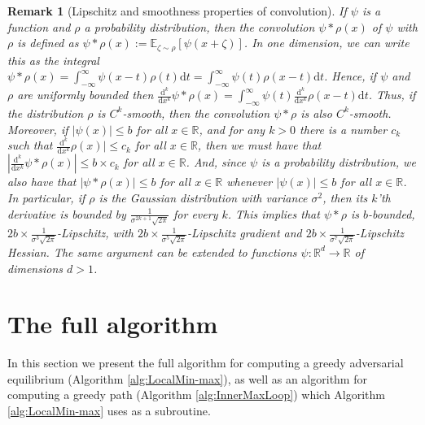\documentclass[11pt,letterpaper]{article}
\newtheorem{remark}[theorem]{Remark}
\begin{document}
\begin{remark}[Lipschitz and smoothness properties of convolution] \label{Rem_Lipschitz_convolution}
%
If $\psi$ is a function and $\rho$ a probability distribution, then the convolution $\psi \ast \rho (x)$ of $\psi$ with $\rho$ is  defined as $\psi \ast \rho (x) := \mathbb{E}_{\zeta \sim \rho}\left [\psi(x  + \zeta)\right]$.  In one dimension, we can write this as the integral $\psi \ast \rho (x) = \int_{-\infty}^\infty \psi(x-t) \rho(t) \mathrm{d}t =  \int_{-\infty}^\infty \psi(t) \rho(x-t) \mathrm{d}t$. 
%
 Hence, if $\psi$ and $\rho$ are uniformly bounded then $\frac{\mathrm{d}^k}{\mathrm{d} x^k} \psi \ast \rho (x) =  \int_{-\infty}^\infty \psi(t) \frac{\mathrm{d}^k}{\mathrm{d} x^k} \rho(x-t) \mathrm{d}t$.
  Thus, if the distribution $\rho$ is $C^k$-smooth, then the convolution $\psi \ast \rho$ is also $C^k$-smooth. 
   Moreover, if $|\psi(x)| \leq b$  for all $x \in \mathbb{R}$, and for any $k>0$ there is a number $c_k$ such that $\frac{\mathrm{d}^k}{\mathrm{d} x^k} \rho(x)| \leq c_k$ for all $x \in \mathbb{R}$, then we must have that $|\frac{\mathrm{d}^k}{\mathrm{d} x^k} \psi \ast \rho (x)| \leq b \times c_k$ for all $x \in \mathbb{R}$. 
    And, since $\psi$ is a probability distribution, we also have that $|\psi \ast \rho (x)| \leq b$ for all $x \in \mathbb{R}$ whenever $|\psi(x)| \leq b$  for all $x \in \mathbb{R}$. 
     In particular, if $\rho$ is the Gaussian distribution with variance $\sigma^2$, then its $k$'th derivative is bounded by $\frac{1}{\sigma^{2k+1} \sqrt{2 \pi}}$ for every $k$. 
     This implies that $\psi \ast \rho$ is $b$-bounded,  $2b \times \frac{1}{\sigma^{3} \sqrt{2 \pi}}$-Lipschitz, with $2b \times \frac{1}{\sigma^{5} \sqrt{2 \pi}}$-Lipschitz gradient and $2b \times \frac{1}{\sigma^{7} \sqrt{2 \pi}}$-Lipschitz Hessian. 
      The same argument can be extended to functions $\psi: \mathbb{R}^d \rightarrow \mathbb{R}$ of dimensions $d>1$.
\end{remark}



\section{The full algorithm} \label{sec_algorithm_overview_full} \label{sec:algorithm}
In this section we present the full algorithm for computing a greedy adversarial equilibrium (Algorithm \ref{alg:LocalMin-max}), as well as an algorithm for computing a greedy path (Algorithm \ref{alg:InnerMaxLoop}) which Algorithm \ref{alg:LocalMin-max} uses as a subroutine.
\end{document}

